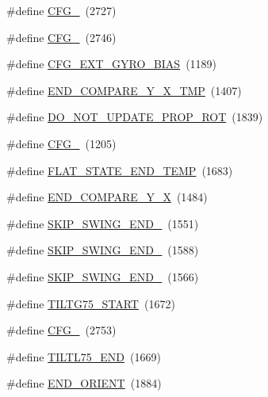 \begin{DoxyCompactItemize}
\item 
\#define \hyperlink{group___d_r_i_v_e_r_s_ga1fe6e4489855269e7197beb38b07c723}{C\+F\+G\+\_}~(2727)
\item 
\#define \hyperlink{group___d_r_i_v_e_r_s_ga7e9d5deadbd595432b6319178d573cd3}{C\+F\+G\+\_}~(2746)
\item 
\#define \hyperlink{group___d_r_i_v_e_r_s_ga63971727875ac02e2ce6632bd3f82bc2}{C\+F\+G\+\_\+\+E\+X\+T\+\_\+\+G\+Y\+R\+O\+\_\+\+B\+I\+AS}~(1189)
\item 
\#define \hyperlink{group___d_r_i_v_e_r_s_gae9f800bcc27bb65de184d1dbe9c0ce24}{E\+N\+D\+\_\+\+C\+O\+M\+P\+A\+R\+E\+\_\+\+Y\+\_\+\+X\+\_\+\+T\+MP}~(1407)
\item 
\#define \hyperlink{group___d_r_i_v_e_r_s_gae7f639b1d39b818bc03ba14cf334bf68}{D\+O\+\_\+\+N\+O\+T\+\_\+\+U\+P\+D\+A\+T\+E\+\_\+\+P\+R\+O\+P\+\_\+\+R\+OT}~(1839)
\item 
\#define \hyperlink{group___d_r_i_v_e_r_s_gaf07742dc92c885f8f7d59e70683f9257}{C\+F\+G\+\_}~(1205)
\item 
\#define \hyperlink{group___d_r_i_v_e_r_s_gaba18283a93fa46f0251d4a6131ed2d5d}{F\+L\+A\+T\+\_\+\+S\+T\+A\+T\+E\+\_\+\+E\+N\+D\+\_\+\+T\+E\+MP}~(1683)
\item 
\#define \hyperlink{group___d_r_i_v_e_r_s_gab843d731bb3863d28961b6a92f302053}{E\+N\+D\+\_\+\+C\+O\+M\+P\+A\+R\+E\+\_\+\+Y\+\_\+X}~(1484)
\item 
\#define \hyperlink{group___d_r_i_v_e_r_s_gae14f280fb2449ecb6dcb8782a8dfd088}{S\+K\+I\+P\+\_\+\+S\+W\+I\+N\+G\+\_\+\+E\+N\+D\+\_}~(1551)
\item 
\#define \hyperlink{group___d_r_i_v_e_r_s_ga17ac0b4bafc904502e30e9c718a83d15}{S\+K\+I\+P\+\_\+\+S\+W\+I\+N\+G\+\_\+\+E\+N\+D\+\_}~(1588)
\item 
\#define \hyperlink{group___d_r_i_v_e_r_s_gad179280ab7654fcada6f0816f6b0eda8}{S\+K\+I\+P\+\_\+\+S\+W\+I\+N\+G\+\_\+\+E\+N\+D\+\_}~(1566)
\item 
\#define \hyperlink{group___d_r_i_v_e_r_s_ga158f88485952a3849f3833c145854d99}{T\+I\+L\+T\+G75\+\_\+\+S\+T\+A\+RT}~(1672)
\item 
\#define \hyperlink{group___d_r_i_v_e_r_s_ga40938f669c5b33b4316a7a5fba679eba}{C\+F\+G\+\_}~(2753)
\item 
\#define \hyperlink{group___d_r_i_v_e_r_s_gac23b1dfe6637cd51283c18aa3d2e9c50}{T\+I\+L\+T\+L75\+\_\+\+E\+ND}~(1669)
\item 
\#define \hyperlink{group___d_r_i_v_e_r_s_gabe465e03425237cc6043670f55f28d02}{E\+N\+D\+\_\+\+O\+R\+I\+E\+NT}~(1884)

\end{DoxyCompactItemize}
